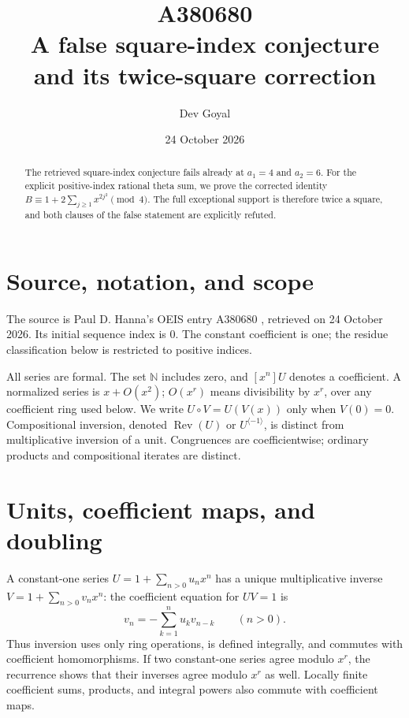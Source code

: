 \documentclass[11pt,a4paper]{article}
\title{A380680\\[4pt]\large A false square-index conjecture and its twice-square correction}
\author{Dev Goyal}
\date{24 October 2026}
\theoremstyle{remark}
\newcommand{\N}{\mathbb N}
\newcommand{\Rev}{\operatorname{Rev}}
\newcommand{\rev}{^{\langle-1\rangle}}
\begin{document}
\maketitle
\begin{center}
\end{center}
\begin{abstract}
The retrieved square-index conjecture fails already at $a_1=4$ and $a_2=6$. For the explicit positive-index rational theta sum, we prove the corrected identity $B\equiv1+2\sum_{j\ge1}x^{2j^2}\pmod4$. The full exceptional support is therefore twice a square, and both clauses of the false statement are explicitly refuted.
\end{abstract}

\section{Source, notation, and scope}

The source is Paul D. Hanna's OEIS entry A380680 \cite{oeis680},
retrieved on 24 October 2026. Its initial sequence index is 0.
The constant coefficient is one; the residue classification below
is restricted to positive indices.

All series are formal. The set $\N$ includes zero, and $[x^n]U$ denotes a
coefficient. A normalized series is $x+O(x^2)$; $O(x^r)$ means divisibility
by $x^r$, over any coefficient ring used below. We write $U\circ V=U(V(x))$
only when $V(0)=0$. Compositional inversion, denoted $\Rev(U)$ or $U\rev$,
is distinct from multiplicative inversion of a unit. Congruences are
coefficientwise; ordinary products and compositional iterates are distinct.

\section{Units, coefficient maps, and doubling}

A constant-one series $U=1+\sum_{n>0}u_nx^n$ has a unique multiplicative
inverse $V=1+\sum_{n>0}v_nx^n$: the coefficient equation for $UV=1$ is
\[
 v_n=-\sum_{k=1}^n u_kv_{n-k}\qquad(n>0).
\]
Thus inversion uses only ring operations, is defined integrally, and commutes
with coefficient homomorphisms. If two constant-one series agree modulo
$x^r$, the recurrence shows that their inverses agree modulo $x^r$ as well.
Locally finite coefficient sums, products, and integral powers also commute
with coefficient maps.
\end{document}
